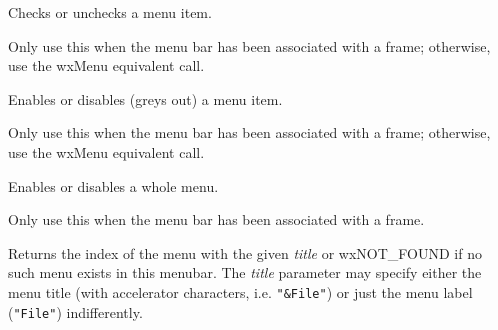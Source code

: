 Checks or unchecks a menu item.





Only use this when the menu bar has been associated
with a frame; otherwise, use the wxMenu equivalent call.

\label{wxmenubarenable}


Enables or disables (greys out) a menu item.





Only use this when the menu bar has been
associated with a frame; otherwise, use the wxMenu equivalent call.

\label{wxmenubarenabletop}


Enables or disables a whole menu.





Only use this when the menu bar has been
associated with a frame.

\label{wxmenubarfindmenu}


Returns the index of the menu with the given {\it title} or wxNOT\_FOUND if no
such menu exists in this menubar. The {\it title} parameter may specify either
the menu title (with accelerator characters, i.e. {\tt "\&File"}) or just the
menu label ({\tt "File"}) indifferently.

\label{wxmenubarfindmenuitem}

